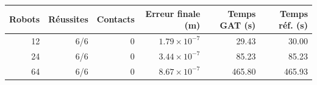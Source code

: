 \begin{tabular}{rrrrrr}
\toprule
Robots & Réussites & Contacts & Erreur finale (m) & Temps GAT (s) & Temps réf. (s)\\\midrule
12 & 6/6 & 0 & $1.79\times10^{-7}$ & 29.43 & 30.00 \\
24 & 6/6 & 0 & $3.44\times10^{-7}$ & 85.23 & 85.23 \\
64 & 6/6 & 0 & $8.67\times10^{-7}$ & 465.80 & 465.93 \\
\bottomrule\end{tabular}

